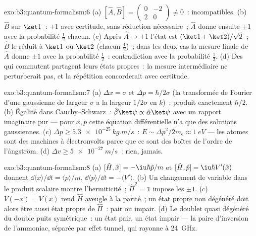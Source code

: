 \begin{solution}{exo:b3:quantum-formalism:6}
(a) $[\hat A, \hat B] = \begin{pmatrix}0 & -2\\ 2 & 0\end{pmatrix}
\neq 0$~: incompatibles. (b) $\hat B$ sur $\ket1$~: $+1$ avec
certitude, sans réduction nécessaire~; $\hat A$ donne ensuite $\pm1$
avec la probabilité $\tfrac12$ chacun. (c) Après $\hat A \to +1$
l'état est $(\ket1 + \ket2)/\sqrt2$~; $\hat B$ le réduit à $\ket1$ ou
$\ket2$ (chacun $\tfrac12$)~; dans les deux cas la mesure finale de
$\hat A$ donne $\pm1$ avec la probabilité $\tfrac12$~: contradiction
avec la probabilité $\tfrac12$. (d) Des  qui commutent
partagent leurs états propres~: la mesure intermédiaire ne
perturberait pas, et la répétition concorderait avec certitude.
\end{solution}

\begin{solution}{exo:b3:quantum-formalism:7}
(a) $\Delta x = \sigma$ et $\Delta p = \hbar/2\sigma$ (la transformée
de Fourier d'une gaussienne de largeur $\sigma$ a la largeur
$1/2\sigma$ en $k$)~: produit exactement $\hbar/2$. (b) Égalité dans
Cauchy--Schwarz~: $\hat\beta\ket\psi \propto \hat\alpha\ket\psi$ avec
un rapport imaginaire pur --- pour $x, p$ cette équation
différentielle n'a que des solutions gaussiennes. (c) $\Delta p \ge \qty{5.3e-25}{kg.m/s}$~: $E \sim
\Delta p^2/2m_{\text{e}} \approx \qty{1}{eV}$ --- les atomes sont des
machines à électronvolts parce que ce sont des boîtes de l'ordre de
l'ångström. (d) $\Delta v \ge \qty{5e-27}{m/s}$~: rien, jamais.
\end{solution}

\begin{solution}{exo:b3:quantum-formalism:8}
(a) $[\hat H, \hat x] = -\iu\hbar\hat p/m$ et $[\hat H, \hat p] =
\iu\hbar V'(\hat x)$ donnent $\dd\langle x\rangle/\dd t = \langle
p\rangle/m$, $\dd\langle p\rangle/\dd t = -\langle V'\rangle$. (b)
Un changement de variable dans le produit scalaire montre
l'hermiticité~; $\hat\Pi^2 = \mathbb 1$ impose les  $\pm1$. (c) $V(-x) =
V(x)$ rend $\hat H$ aveugle à la parité~; un état propre non dégénéré
doit alors être aussi état propre de $\hat\Pi$~: pair ou impair. (d)
Le doublet quasi dégénéré du double puits symétrique~: un état pair,
un état impair --- la paire d'inversion de l'ammoniac, séparée par
effet tunnel, qui rayonne à \qty{24}{GHz}.
\end{solution}

